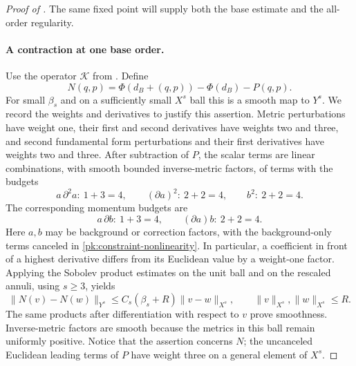 \begin{proof}[Proof of ]
The same fixed point will supply both the base estimate and the
all-order regularity.

\paragraph{A contraction at one base order.}
Use the operator $\mathcal K$ from .
Define
\begin{equation}
 N(q,p)=\Phi(d_B+(q,p))-\Phi(d_B)-P(q,p).
 \label{pk:constraint-nonlinearity}
\end{equation}
For small \(\beta_s\) and on a sufficiently small \(X^s\) ball this
is a smooth map to \(Y^s\).  We record the weights and derivatives
to justify this assertion.  Metric perturbations have weight one,
their first and second derivatives have weights two and three,
and second fundamental form perturbations and their first derivatives have weights
two and three.  After subtraction of \(P\), the scalar terms are
linear combinations, with smooth bounded inverse-metric factors,
of terms with the budgets
\[
 a\,\partial^2a:\ 1+3=4,\qquad
 (\partial a)^2:\ 2+2=4,\qquad
 b^2:\ 2+2=4.
\]
The corresponding momentum budgets are
\[
 a\,\partial b:\ 1+3=4,\qquad
 (\partial a)b:\ 2+2=4.
\]
Here \(a,b\) may be background or correction factors, with the
background-only terms canceled in
\eqref{pk:constraint-nonlinearity}.  In particular, a coefficient in
front of a highest derivative differs from its Euclidean value by
a weight-one factor.  Applying the Sobolev product estimates on
the unit ball and on the rescaled annuli, using \(s\geq3\), yields
\begin{equation}
 \|N(v)-N(w)\|_{Y^s}
   \leq C_s(\beta_s+R)\|v-w\|_{X^s},
 \qquad \|v\|_{X^s},\|w\|_{X^s}\leq R.
 \label{pk:constraint-Lipschitz}
\end{equation}
The same products after differentiation with respect to \(v\) prove
smoothness.  Inverse-metric factors are smooth because the metrics
in this ball remain uniformly positive.  Notice that the assertion
concerns \(N\); the uncanceled Euclidean leading terms of \(P\) have
weight three on a general element of \(X^s\).


\end{proof}

